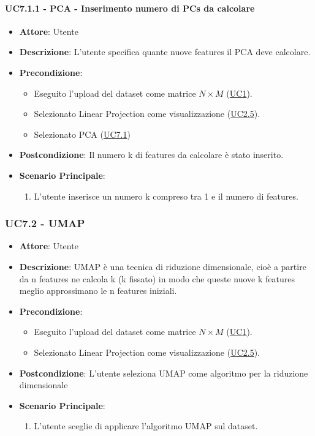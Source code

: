     \paragraph{UC7.1.1 - PCA - Inserimento numero di PCs da calcolare}
    \label{uc7.1.1}
    \begin{itemize}
    \item \textbf{Attore}: Utente
    \item \textbf{Descrizione}: L'utente specifica quante nuove features il PCA deve calcolare.
    \item \textbf{Precondizione}: 
    \begin{itemize}
        \item Eseguito l'upload del dataset come matrice $N\times M$ (\hyperref[uc1]{UC1}).
        \item Selezionato Linear Projection come visualizzazione (\hyperref[uc2.5]{UC2.5}).
        \item Selezionato PCA (\hyperref[uc7.1]{UC7.1})
    \end{itemize}  
    \item \textbf{Postcondizione}: Il numero k di features da calcolare è stato inserito.
    \item \textbf{Scenario Principale}: 
    \begin{enumerate}
        \item L'utente inserisce un numero k compreso tra 1 e il numero di features.
    \end{enumerate}  
    \end{itemize}
    
    \subsubsection{UC7.2 - UMAP}
    \label{uc7.2}
    \begin{itemize}
    \item \textbf{Attore}: Utente
    \item \textbf{Descrizione}: UMAP è una tecnica di riduzione dimensionale, cioè a partire da n features ne calcola k (k fissato) in modo che queste nuove k features meglio approssimano le n features iniziali.
    \item \textbf{Precondizione}: 
    \begin{itemize}
        \item Eseguito l'upload del dataset come matrice $N\times M$ (\hyperref[uc1]{UC1}).
        \item Selezionato Linear Projection come visualizzazione (\hyperref[uc2.5]{UC2.5}).
    \end{itemize}  
    \item \textbf{Postcondizione}: L'utente seleziona UMAP come algoritmo per la riduzione dimensionale
    \item \textbf{Scenario Principale}: 
    \begin{enumerate}
        \item L'utente sceglie di applicare l'algoritmo UMAP sul dataset.
    \end{enumerate}
    \end{itemize}
    
